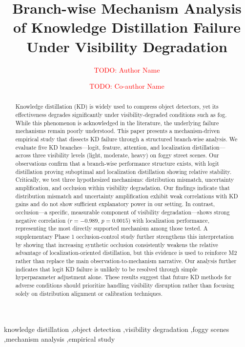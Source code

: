 \documentclass[preprint,12pt]{elsarticle}
\begin{document}
\begin{frontmatter}

\title{Branch-wise Mechanism Analysis of Knowledge Distillation Failure Under Visibility Degradation}

\author[1]{\textcolor{red}{TODO: Author Name}}

\author[1]{\textcolor{red}{TODO: Co-author Name}}

\address[1]{\textcolor{red}{TODO: Department, University, Address}}

\begin{abstract}
Knowledge distillation (KD) is widely used to compress object detectors, yet its effectiveness degrades significantly under visibility-degraded conditions such as fog. While this phenomenon is acknowledged in the literature, the underlying failure mechanisms remain poorly understood. This paper presents a mechanism-driven empirical study that dissects KD failure through a structured branch-wise analysis. We evaluate five KD branches---logit, feature, attention, and localization distillation---across three visibility levels (light, moderate, heavy) on foggy street scenes. Our observations confirm that a branch-wise performance structure exists, with logit distillation proving suboptimal and localization distillation showing relative stability. Critically, we test three hypothesized mechanisms: distribution mismatch, uncertainty amplification, and occlusion within visibility degradation. Our findings indicate that distribution mismatch and uncertainty amplification exhibit weak correlations with KD gains and do not show sufficient explanatory power in our setting. In contrast, occlusion---a specific, measurable component of visibility degradation---shows strong negative correlation ($r=-0.989$, $p=0.0015$) with localization performance, representing the most directly supported mechanism among those tested. A supplementary Phase 1 occlusion-control study further strengthens this interpretation by showing that increasing synthetic occlusion consistently weakens the relative advantage of localization-oriented distillation, but this evidence is used to reinforce M2 rather than replace the main observation-to-mechanism narrative. Our analysis further indicates that logit KD failure is unlikely to be resolved through simple hyperparameter adjustment alone. These results suggest that future KD methods for adverse conditions should prioritize handling visibility disruption rather than focusing solely on distribution alignment or calibration techniques.
\end{abstract}

\begin{keyword}
knowledge distillation \sep object detection \sep visibility degradation \sep foggy scenes \sep mechanism analysis \sep empirical study
\end{keyword}

\end{frontmatter}
\end{document}
